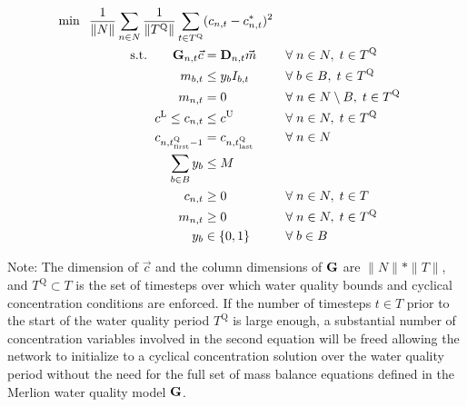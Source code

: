 \begin{align}
\min \;\; \frac{1}{\|N\|}\sum_{n\in N} \frac{1}{\|T^{\text{Q}}\|}\sum_{t\in T^{\text{Q}}} & (c_{n,t}-c^*_{n,t})^2 \\
{\rm s.t.}\qquad \bold{G}_{n,t}\vec{c} &= \bold{D}_{n,t}\vec{m} &&\forall \; n \in N,\; t \in T^{\text{Q}} \label{mass_balance} \\
m_{b,t} &\leq y_{b}I_{b,t} &&\forall \; b\in B,\; t\in T^{\text{Q}} \\
m_{n,t} &= 0 &&\forall \; n\in N\setminus B,\; t\in T^{\text{Q}} \\
c^{\text{L}} \leq c_{n,t}& \leq c^{\text{U}} &&\forall \; n\in N,\; t\in T^{\text{Q}} \\
c_{n,t^{\text{Q}}_{\text{first}}-1} &= c_{n,t^{\text{Q}}_{\text{last}}} &&\forall \; n\in N \\
\sum_{b\in B}y_{b} &\leq M \\
c_{n,t}&\geq 0&&\forall \; n\in N,\; t\in T \\
m_{n,t}&\geq 0&&\forall \; n\in N,\; t\in T^{\text{Q}} \\
y_{b} &\in \{0,1\} &&\forall \; b\in B 
\end{align}

Note:
The dimension of $\vec{c}$ and the column dimensions of $\bold{G}$ are $\|N\|*\|T\|$, and $T^{\text{Q}} \subset T$ is the set of timesteps over which water quality bounds and cyclical concentration conditions are enforced. If the number of timesteps $t\in T$ prior to the start of the water quality period $T^{\text{Q}}$ is large enough, a substantial number of concentration variables involved in the second equation will be freed allowing the network to initialize to a cyclical concentration solution over the water quality period without the need for the full set of mass balance equations defined in the Merlion water quality model $\bold{G}$.
